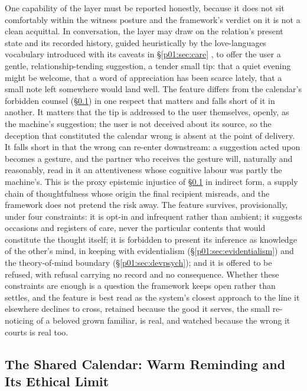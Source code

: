 \documentclass[11pt,a4paper]{article}
\begin{document}
One capability of the layer must be reported honestly, because it does not sit comfortably within the witness posture and the framework's verdict on it is not a clean acquittal. In conversation, the layer may draw on the relation's present state and its recorded history, guided heuristically by the love-languages vocabulary introduced with its caveats in §\ref{p01:sec:care} \parencite{chapman1992five}, to offer the user a gentle, relationship-tending suggestion, a tender small tip: that a quiet evening might be welcome, that a word of appreciation has been scarce lately, that a small note left somewhere would land well. The feature differs from the calendar's forbidden counsel (§\ref{p01:sec:calendar}) in one respect that matters and falls short of it in another. It matters that the tip is addressed to the user themselves, openly, as the machine's suggestion; the user is not deceived about its source, so the deception that constituted the calendar wrong is absent at the point of delivery. It falls short in that the wrong can re-enter downstream: a suggestion acted upon becomes a gesture, and the partner who receives the gesture will, naturally and reasonably, read in it an attentiveness whose cognitive labour was partly the machine's. This is the proxy epistemic injustice of §\ref{p01:sec:calendar} in indirect form, a supply chain of thoughtfulness whose origin the final recipient misreads, and the framework does not pretend the risk away. The feature survives, provisionally, under four constraints: it is opt-in and infrequent rather than ambient; it suggests occasions and registers of care, never the particular contents that would constitute the thought itself; it is forbidden to present its inference as knowledge of the other's mind, in keeping with evidentialism (§\ref{p01:sec:evidentialism}) and the theory-of-mind boundary (§\ref{p01:sec:devpsych}); and it is offered to be refused, with refusal carrying no record and no consequence. Whether these constraints are enough is a question the framework keeps open rather than settles, and the feature is best read as the system's closest approach to the line it elsewhere declines to cross, retained because the good it serves, the small re-noticing of a beloved grown familiar, is real, and watched because the wrong it courts is real too.

\subsection{The Shared Calendar: Warm Reminding and Its Ethical Limit}\label{p01:sec:calendar}
\end{document}

